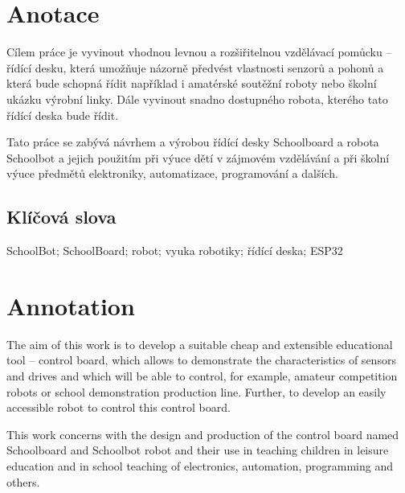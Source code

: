\documentclass{template/socthesis}
\author{Tomáš Vavrinec}
\begin{document}
\maketitle



\pagestyle{empty}

\section*{Anotace}

Cílem práce je  vyvinout vhodnou levnou a rozšiřitelnou vzdělávací pomůcku -- řídící desku, která umožňuje názorně předvést vlastnosti senzorů a pohonů a která bude schopná řídit například i amatérské soutěžní roboty nebo školní ukázku výrobní linky. Dále vyvinout snadno dostupného robota, kterého tato řídící deska bude řídit.

Tato práce se zabývá návrhem a výrobou řídící desky Schoolboard a robota Schoolbot a jejich použitím při výuce dětí v zájmovém vzdělávání a při školní výuce předmětů elektroniky, automatizace, programování a dalších. 

\subsection*{Klíčová slova}
SchoolBot; SchoolBoard; robot; vyuka robotiky; řídící deska; ESP32

\vspace{20mm}

\section*{Annotation}

The aim of this work is to develop a suitable cheap and extensible educational tool -- control board, which allows to demonstrate the characteristics of sensors and drives and which will be able to control, for example, amateur competition robots or school demonstration production line. Further, to develop an easily accessible robot to control this control board.

This work concerns with the design and production of the control board named Schoolboard and Schoolbot robot and their use in teaching children in leisure education and in school teaching of electronics, automation, programming and others.
\end{document}
